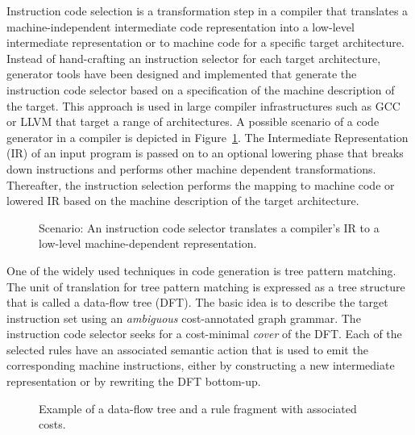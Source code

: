 

Instruction code selection is a transformation step in a compiler that
translates a machine-independent intermediate code representation into
a low-level intermediate representation or to machine code for a
specific target architecture. Instead of hand-crafting an instruction
selector for each target architecture, generator tools have been
designed and implemented that generate the instruction code selector based
on a specification of the machine description of the
target. This approach is used in large compiler infrastructures such
as GCC or LLVM that target a range of architectures.  A possible
scenario of a code generator in a compiler is depicted in
Figure~\ref{fig:instruction-selection}. The Intermediate
Representation (IR) of an input program is passed on to an optional
lowering phase that breaks down instructions and performs other
machine dependent transformations. Thereafter, the instruction
selection performs the mapping to machine code or lowered IR based on
the machine description of the target architecture.


\begin{figure}[t]
  \begin{center}
  \end{center}
  \caption{Scenario: An instruction code selector translates a compiler's IR to a
    low-level machine-dependent representation.}
  \label{fig:instruction-selection}
\end{figure}

One of the widely used techniques in code generation is tree pattern
matching. The unit of translation for tree pattern matching is 
expressed as a tree structure
that is called a data-flow tree (DFT). 
The basic idea is
to describe the target instruction set using an \emph{ambiguous}
cost-annotated graph grammar. The instruction code selector seeks for a
cost-minimal \emph{cover} of the DFT. Each of the selected rules have
an associated semantic action that is used to emit the corresponding
machine instructions, either by constructing a new intermediate
representation or by rewriting the DFT bottom-up.
\begin{figure}[ht]
  \begin{center}
  \end{center}
  \caption{Example of a data-flow tree and a rule fragment with associated costs.}
  \label{fig:tpm}
\end{figure}

